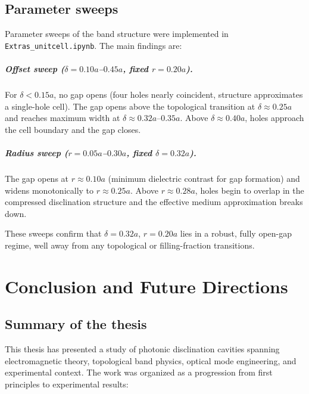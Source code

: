 \documentclass[12pt,a4paper,oneside]{book}
\theoremstyle{plain}
\theoremstyle{definition}
\theoremstyle{remark}
\begin{document}
\section{Parameter sweeps}
\label{sec:param-sweeps}

Parameter sweeps of the band structure were implemented in \texttt{Extras\_unitcell.ipynb}. The main findings are:

\paragraph{Offset sweep ($\delta = 0.10a$--$0.45a$, fixed $r = 0.20a$).} For $\delta < 0.15a$, no gap opens (four holes nearly coincident, structure approximates a single-hole cell). The gap opens above the topological transition at $\delta \approx 0.25a$ and reaches maximum width at $\delta \approx 0.32a$--$0.35a$. Above $\delta \approx 0.40a$, holes approach the cell boundary and the gap closes.

\paragraph{Radius sweep ($r = 0.05a$--$0.30a$, fixed $\delta = 0.32a$).} The gap opens at $r \approx 0.10a$ (minimum dielectric contrast for gap formation) and widens monotonically to $r \approx 0.25a$. Above $r \approx 0.28a$, holes begin to overlap in the compressed disclination structure and the effective medium approximation breaks down.

These sweeps confirm that $\delta = 0.32a$, $r = 0.20a$ lies in a robust, fully open-gap regime, well away from any topological or filling-fraction transitions.

\chapter{Conclusion and Future Directions}
\label{chap:conclusion}

\section{Summary of the thesis}
\label{sec:summary}

This thesis has presented a study of photonic disclination cavities spanning electromagnetic theory, topological band physics, optical mode engineering, and experimental context. The work was organized as a progression from first principles to experimental results:
\end{document}
